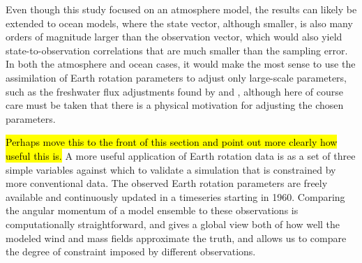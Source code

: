Even though this study focused on an atmosphere model, the results can likely be extended to ocean models, where the state vector, although smaller, is also many orders of magnitude larger than the observation vector, which would also yield state-to-observation correlations that are much smaller than the sampling error. 
In both the atmosphere and ocean cases, it would make the most sense to use the assimilation of Earth rotation parameters to adjust only large-scale parameters, such as the freshwater flux adjustments found by \citet{Saynisch2010} and \citet{Saynisch2012}, although here of course care must be taken that there is a physical motivation for adjusting the chosen parameters.  

\hl{Perhaps move this to the front of this section and point out more clearly how useful this is.}
A more useful application of Earth rotation data is as a set of three simple variables against which to validate a simulation that is constrained by more conventional data.  
The observed Earth rotation parameters are freely available \citep{iers} and continuously updated in a timeseries starting in 1960. 
Comparing the angular momentum of a model ensemble to these observations is computationally straightforward, and 
gives a global view both of how well the modeled wind and mass fields approximate the truth, and allows us to compare the degree of constraint imposed by different observations. 



